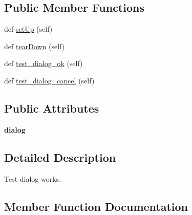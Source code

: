 \subsection*{Public Member Functions}
\begin{DoxyCompactItemize}
\item 
def \mbox{\hyperlink{class_dsg_tools_1_1test_1_1test__dsg__tools__dialog_1_1_dsg_tools_dialog_test_a696846e37ba680ce6a586acbeabc14d7}{set\+Up}} (self)
\item 
def \mbox{\hyperlink{class_dsg_tools_1_1test_1_1test__dsg__tools__dialog_1_1_dsg_tools_dialog_test_a67fc652cbafedc48ed1374264e26dd12}{tear\+Down}} (self)
\item 
def \mbox{\hyperlink{class_dsg_tools_1_1test_1_1test__dsg__tools__dialog_1_1_dsg_tools_dialog_test_a1178967d97c781f58b6eeca8a7757587}{test\+\_\+dialog\+\_\+ok}} (self)
\item 
def \mbox{\hyperlink{class_dsg_tools_1_1test_1_1test__dsg__tools__dialog_1_1_dsg_tools_dialog_test_a380423d7e3d5be76d6353a9e61ae34ce}{test\+\_\+dialog\+\_\+cancel}} (self)
\end{DoxyCompactItemize}
\subsection*{Public Attributes}
\begin{DoxyCompactItemize}
\item 
\mbox{\label{class_dsg_tools_1_1test_1_1test__dsg__tools__dialog_1_1_dsg_tools_dialog_test_a4807e4c81a4da1e9c6b47b17509be5ba}} 
{\bfseries dialog}
\end{DoxyCompactItemize}


\subsection{Detailed Description}
\begin{DoxyVerb}Test dialog works.\end{DoxyVerb}
 

\subsection{Member Function Documentation}
\mbox{\label{class_dsg_tools_1_1test_1_1test__dsg__tools__dialog_1_1_dsg_tools_dialog_test_a696846e37ba680ce6a586acbeabc14d7}} 
